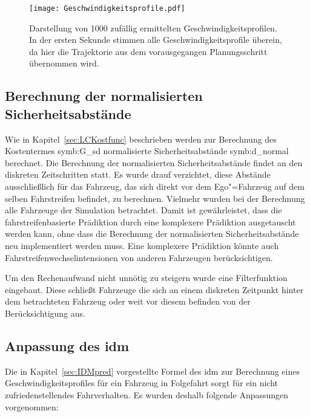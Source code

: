  
\begin{figure}[!htbp]
    \centering
    \texttt{[image: Geschwindigkeitsprofile.pdf]}
    \caption[Erzeugung von Geschwindigkeitsprofilen]{Darstellung von 1000 zuf\"allig ermittelten Geschwindigkeitsprofilen. In der ersten Sekunde stimmen alle Geschwindigkeitsprofile \"uberein, da hier die Trajektorie aus dem vorausgegangen Planungsschritt \"ubernommen wird.}
    \label{fig:Geschwindgkeitsprofile}
\end{figure}


\subsection{Berechnung der normalisierten Sicherheitsabst\"ande}
Wie in Kapitel~\ref{sec:LCKostfunc} beschrieben werden zur Berechnung des Kostentermes \gls{symb:G_sd} normalisierte Sicherheitsabst\"ande \gls{symb:d_normal} berechnet.
Die Berechnung der normalisierten Sicherheitsabst\"ande findet an den diskreten Zeitschritten statt.
Es wurde drauf verzichtet, diese Abst\"ande ausschlie{\ss}lich f\"ur das Fahrzeug, das sich direkt vor dem Ego"=Fahrzeug auf dem selben Fahrstreifen befindet, zu berechnen.
Vielmehr wurden bei der Berechnung alle Fahrzeuge der Simulation betrachtet.
Damit ist gew\"ahrleistet, dass die fahrstreifenbasierte Pr\"adiktion durch eine komplexere Pr\"adiktion ausgetauscht werden kann, ohne dass die Berechnung der normalisierten Sicherheitsabst\"ande neu implementiert werden muss.
Eine komplexere Pr\"adiktion k\"onnte auch Fahrstreifenwechselintensionen von anderen Fahrzeugen ber\"ucksichtigen.

Um den Rechenaufwand nicht unn\"otig zu steigern wurde eine Filterfunktion eingebaut.
Diese schlie{\ss}t Fahrzeuge die sich an einem diskreten Zeitpunkt hinter dem betrachteten Fahrzeug oder weit vor diesem befinden von der Ber\"ucksichtigung aus.


\subsection{Anpassung des \gls{idm}}
Die in Kapitel~\ref{sec:IDMpred} vorgestellte Formel des \gls{idm} zur Berechnung eines Geschwindigkeitsprofiles f\"ur ein Fahrzeug in Folgefahrt sorgt f\"ur ein nicht zufriedenstellendes Fahrverhalten.
Es wurden deshalb folgende Anpassungen vorgenommen:

